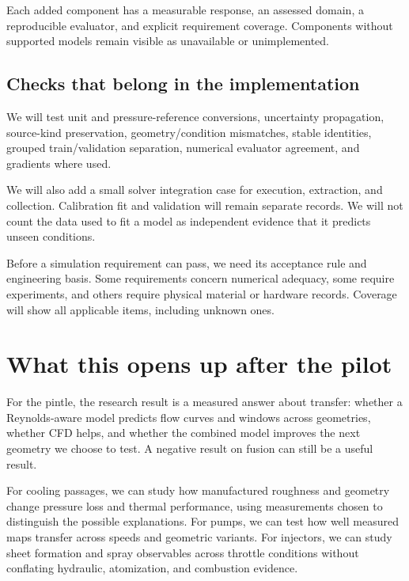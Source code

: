Each added component has a measurable response, an assessed domain, a reproducible evaluator, and explicit requirement coverage. Components without supported models remain visible as unavailable or unimplemented.

\subsection{Checks that belong in the implementation}

We will test unit and pressure-reference conversions, uncertainty propagation, source-kind preservation, geometry/condition mismatches, stable identities, grouped train/validation separation, numerical evaluator agreement, and gradients where used.

We will also add a small solver integration case for execution, extraction, and collection. Calibration fit and validation will remain separate records. We will not count the data used to fit a model as independent evidence that it predicts unseen conditions.

Before a simulation requirement can pass, we need its acceptance rule and engineering basis. Some requirements concern numerical adequacy, some require experiments, and others require physical material or hardware records. Coverage will show all applicable items, including unknown ones.


\section{What this opens up after the pilot}

For the pintle, the research result is a measured answer about transfer: whether a Reynolds-aware model predicts flow curves and windows across geometries, whether CFD helps, and whether the combined model improves the next geometry we choose to test. A negative result on fusion can still be a useful result.

For cooling passages, we can study how manufactured roughness and geometry change pressure loss and thermal performance, using measurements chosen to distinguish the possible explanations. For pumps, we can test how well measured maps transfer across speeds and geometric variants. For injectors, we can study sheet formation and spray observables across throttle conditions without conflating hydraulic, atomization, and combustion evidence.

